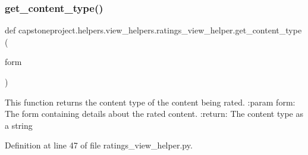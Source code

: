 \subsubsection{\texorpdfstring{get\+\_\+content\+\_\+type()}{get\_content\_type()}}
{\footnotesize\ttfamily def capstoneproject.\+helpers.\+view\+\_\+helpers.\+ratings\+\_\+view\+\_\+helper.\+get\+\_\+content\+\_\+type (\begin{DoxyParamCaption}\item[{}]{form }\end{DoxyParamCaption})}

\begin{DoxyVerb}This function returns the content type of the content being rated.
:param form: The form containing details about the rated content.
:return: The content type as a string
\end{DoxyVerb}
 

Definition at line 47 of file ratings\+\_\+view\+\_\+helper.\+py.


